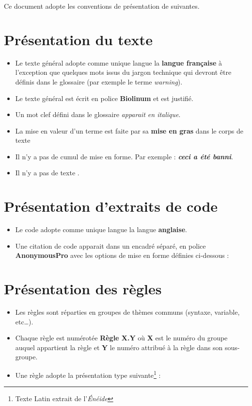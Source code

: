 Ce document adopte les conventions de présentation de suivantes. \medskip

\section{Présentation du texte}

\begin{itemize}
\item Le texte général adopte comme unique langue la \textbf{langue française} à l'exception que quelques mots issus du jargon technique qui devront être définis dans le glossaire (par exemple le terme \textit{warning}).
\item Le texte général est écrit en police \textbf{Biolinum} et est justifié.
\item Un mot clef défini dans le glossaire \textit{apparait en italique}.
\item La mise en valeur d'un terme est faite par sa \textbf{mise en gras} dans le corps de texte
\item Il n'y a pas de cumul de mise en forme. Par exemple : \textbf{\textit{ceci a été banni}}.
\item Il n'y a pas de texte .
\end{itemize}
\bigskip

\section{Présentation d'extraits de code}

\begin{itemize}
\item Le code adopte comme unique langue la langue \textbf{anglaise}.
\item Une citation de code apparait dans un encadré séparé, en police {\selectfont\textbf{AnonymousPro}} avec les options de mise en forme définies ci-dessous :
\end{itemize}


% 

\pagebreak

\section{Présentation des règles}

\begin{itemize}
\item Les règles sont réparties en groupes de thèmes communs (syntaxe, variable, etc…).
\item Chaque règle est numérotée \textbf{Règle X.Y} où \textbf{X} est le numéro du groupe auquel appartient la règle et \textbf{Y} le numéro attribué à la règle dans son sous-groupe.
\item Une règle adopte la présentation type suivante\footnote{Texte Latin extrait de l'\textit{Énéide}} :
\end{itemize}

